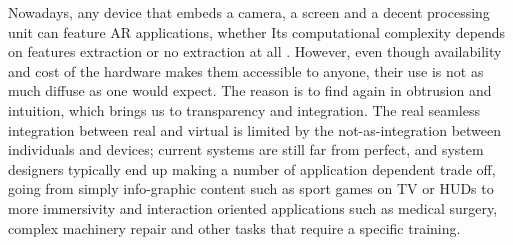 Nowadays, any device that embeds a camera, a screen and a decent processing unit can feature AR applications, whether Its computational complexity depends on features extraction \cite{link_google_translate_AR} or no extraction at all \cite{link_IKEA_AR}. However, even though availability and cost of the hardware makes them accessible to anyone, their use is not as much diffuse as one would expect. The reason is to find again in obtrusion and intuition, which brings us to transparency and integration. The real seamless integration between real and virtual is limited by the not-as-integration between individuals and devices; current systems are still far from perfect, and system designers typically end up making a number of application dependent trade off, going from simply info-graphic content such as sport games on TV or HUDs to more immersivity and interaction oriented applications such as medical surgery, complex machinery repair and other tasks that require a specific training.

